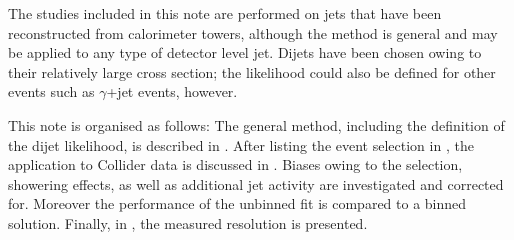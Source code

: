 The studies included in this note are performed on jets that have been reconstructed from calorimeter towers, although the method is general and may be applied to any type of detector level jet.
Dijets have been chosen owing to their relatively large cross section; the likelihood could also be defined for other events such as $\gamma$+jet events, however.

This note is organised as follows:
The general method, including the definition of the dijet likelihood, is described in .
After listing the event selection in , the application to Collider data is discussed in .
Biases owing to the selection, showering effects, as well as additional jet activity are investigated and corrected for.
Moreover the performance of the unbinned fit is compared to a binned solution.
Finally, in , the measured resolution is presented.
